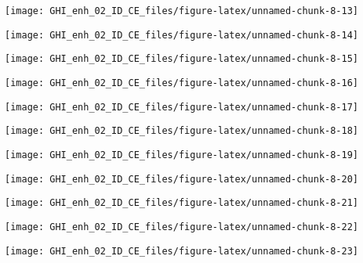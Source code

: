 \documentclass[
  10pt,
  a4paper,oneside]{article}
\begin{document}
\begin{center}\texttt{[image: GHI\_enh\_02\_ID\_CE\_files/figure-latex/unnamed-chunk-8-13]} \end{center}

\begin{center}\texttt{[image: GHI\_enh\_02\_ID\_CE\_files/figure-latex/unnamed-chunk-8-14]} \end{center}

\begin{center}\texttt{[image: GHI\_enh\_02\_ID\_CE\_files/figure-latex/unnamed-chunk-8-15]} \end{center}

\begin{center}\texttt{[image: GHI\_enh\_02\_ID\_CE\_files/figure-latex/unnamed-chunk-8-16]} \end{center}

\begin{center}\texttt{[image: GHI\_enh\_02\_ID\_CE\_files/figure-latex/unnamed-chunk-8-17]} \end{center}

\begin{center}\texttt{[image: GHI\_enh\_02\_ID\_CE\_files/figure-latex/unnamed-chunk-8-18]} \end{center}

\begin{center}\texttt{[image: GHI\_enh\_02\_ID\_CE\_files/figure-latex/unnamed-chunk-8-19]} \end{center}

\begin{center}\texttt{[image: GHI\_enh\_02\_ID\_CE\_files/figure-latex/unnamed-chunk-8-20]} \end{center}

\begin{center}\texttt{[image: GHI\_enh\_02\_ID\_CE\_files/figure-latex/unnamed-chunk-8-21]} \end{center}

\begin{center}\texttt{[image: GHI\_enh\_02\_ID\_CE\_files/figure-latex/unnamed-chunk-8-22]} \end{center}

\begin{center}\texttt{[image: GHI\_enh\_02\_ID\_CE\_files/figure-latex/unnamed-chunk-8-23]} \end{center}
\end{document}
